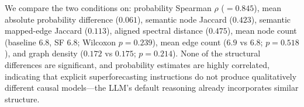 \documentclass[11pt]{article}
\begin{document}
We compare the two conditions on: probability Spearman $\rho$ ($= 0.845$), mean absolute probability difference ($0.061$), semantic node Jaccard ($0.423$), semantic mapped-edge Jaccard ($0.113$), aligned spectral distance ($0.475$), mean node count (baseline $6.8$, SF $6.8$; Wilcoxon $p = 0.239$), mean edge count ($6.9$ vs $6.8$; $p = 0.518$), and graph density ($0.172$ vs $0.175$; $p = 0.214$). None of the structural differences are significant, and probability estimates are highly correlated, indicating that explicit superforecasting instructions do not produce qualitatively different causal models---the LLM's default reasoning already incorporates similar structure.
\end{document}
